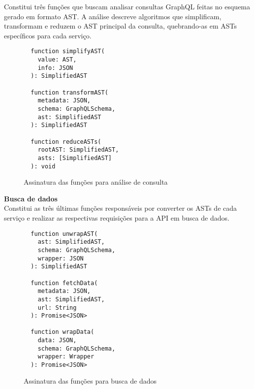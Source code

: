 Constitui três funções que buscam analisar consultas GraphQL feitas no esquema gerado em formato AST. A análise descreve algoritmos que simplificam, transformam e reduzem o AST principal da consulta, quebrando-as em ASTs específicos para cada serviço.

\begin{figure}[H]
  \centering
  \begin{verbatim}
  function simplifyAST(
    value: AST,
    info: JSON
  ): SimplifiedAST

  function transformAST(
    metadata: JSON,
    schema: GraphQLSchema,
    ast: SimplifiedAST
  ): SimplifiedAST

  function reduceASTs(
    rootAST: SimplifiedAST,
    asts: [SimplifiedAST]
  ): void
  \end{verbatim}
  \caption{Assinatura das funções para análise de consulta}
\end{figure}

\textbf{Busca de dados} \\

Constitui as três últimas funções responsáveis por converter os ASTs de cada serviço e realizar as respectivas requisições para a API em busca de dados.

\begin{figure}[H]
  \centering
  \begin{verbatim}
  function unwrapAST(
    ast: SimplifiedAST,
    schema: GraphQLSchema,
    wrapper: JSON
  ): SimplifiedAST

  function fetchData(
    metadata: JSON,
    ast: SimplifiedAST,
    url: String
  ): Promise<JSON>

  function wrapData(
    data: JSON,
    schema: GraphQLSchema,
    wrapper: Wrapper
  ): Promise<JSON>
  \end{verbatim}
  \caption{Assinatura das funções para busca de dados}
\end{figure}
